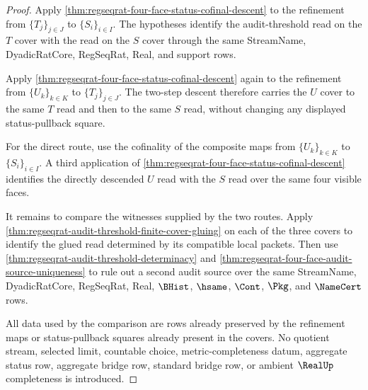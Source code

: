 \begin{proof}
Apply \autoref{thm:regseqrat-four-face-status-cofinal-descent} to the refinement from $\{T_j\}_{j \in J}$ to $\{S_i\}_{i \in I}$. The hypotheses identify the audit-threshold read on the $T$ cover with the read on the $S$ cover through the same StreamName, DyadicRatCore, RegSeqRat, Real, and support rows.

Apply \autoref{thm:regseqrat-four-face-status-cofinal-descent} again to the refinement from $\{U_k\}_{k \in K}$ to $\{T_j\}_{j \in J}$. The two-step descent therefore carries the $U$ cover to the same $T$ read and then to the same $S$ read, without changing any displayed status-pullback square.

For the direct route, use the cofinality of the composite maps from $\{U_k\}_{k \in K}$ to $\{S_i\}_{i \in I}$. A third application of \autoref{thm:regseqrat-four-face-status-cofinal-descent} identifies the directly descended $U$ read with the $S$ read over the same four visible faces.

It remains to compare the witnesses supplied by the two routes. Apply \autoref{thm:regseqrat-audit-threshold-finite-cover-gluing} on each of the three covers to identify the glued read determined by its compatible local packets. Then use \autoref{thm:regseqrat-audit-threshold-determinacy} and \autoref{thm:regseqrat-four-face-audit-source-uniqueness} to rule out a second audit source over the same StreamName, DyadicRatCore, RegSeqRat, Real, $\BHist$, $\hsame$, $\Cont$, $\Pkg$, and $\NameCert$ rows.

All data used by the comparison are rows already preserved by the refinement maps or status-pullback squares already present in the covers. No quotient stream, selected limit, countable choice, metric-completeness datum, aggregate status row, aggregate bridge row, standard bridge row, or ambient $\RealUp$ completeness is introduced.
\end{proof}

